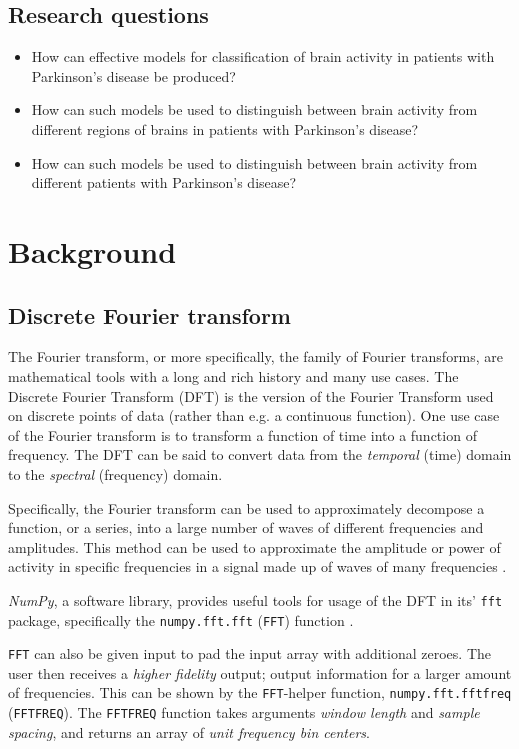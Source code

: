 \documentclass{article}
\begin{document}
\subsection{Research questions}
\begin{itemize}
    \item How can effective models for classification of brain activity in patients with Parkinson's disease be produced?
    \item How can such models be used to distinguish between brain activity from different regions of brains in patients with Parkinson's disease?
    \item How can such models be used to distinguish between brain activity from different patients with Parkinson's disease?
\end{itemize}

\newpage
\section{Background}

\subsection{Discrete Fourier transform}
The Fourier transform, or more specifically, the family of Fourier transforms, are mathematical tools with a long and rich history and many use cases. 
The Discrete Fourier Transform (DFT) is the version of the Fourier Transform used on discrete points of data (rather than e.g. a continuous function). 
One use case of the Fourier transform is to transform a function of time into a function of frequency. 
The DFT can be said to convert data from the \textit{temporal} (time) domain to the \textit{spectral} (frequency) domain.

Specifically, the Fourier transform can be used to approximately decompose a function, or a series, into a large number of waves of different frequencies and amplitudes. 
This method can be used to approximate the amplitude or power of activity in specific frequencies in a signal made up of waves of many frequencies \citep{Fourier}.

\textit{NumPy}, a software library, provides useful tools for usage of the DFT in its' \texttt{fft} package, specifically the \texttt{numpy.fft.fft} (\texttt{FFT}) function \citep{numpy}.

\texttt{FFT} can also be given input to pad the input array with additional zeroes. 
The user then receives a \textit{higher fidelity} output; output information for a larger amount of frequencies.
This can be shown by the \texttt{FFT}-helper function, \texttt{numpy.fft.fftfreq} (\texttt{FFTFREQ}). 
The \texttt{FFTFREQ} function takes arguments \textit{window length} and \textit{sample spacing}, and returns an array of \textit{unit frequency bin centers}. 
\end{document}
